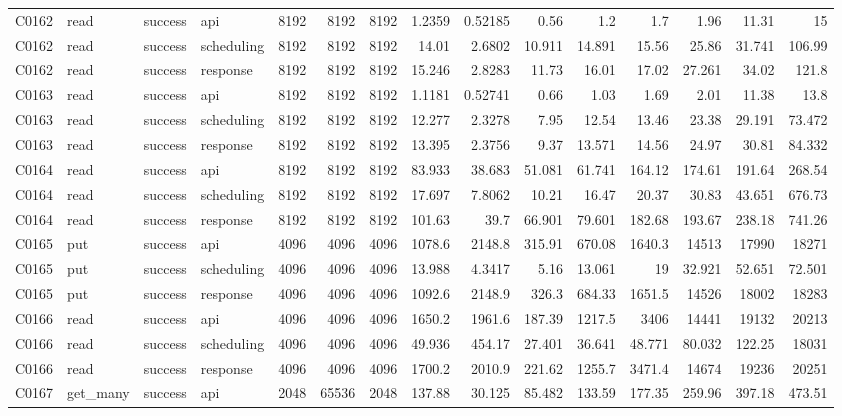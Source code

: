 \begin{landscape}
\begin{longtable}{llllrrrrrrrrrrr}
C0162 & read & success & api & 8192 & 8192 & 8192 & 1.2359 & 0.52185 & 0.56 & 1.2 & 1.7 & 1.96 & 11.31 & 15\\
C0162 & read & success & scheduling & 8192 & 8192 & 8192 & 14.01 & 2.6802 & 10.911 & 14.891 & 15.56 & 25.86 & 31.741 & 106.99\\
C0162 & read & success & response & 8192 & 8192 & 8192 & 15.246 & 2.8283 & 11.73 & 16.01 & 17.02 & 27.261 & 34.02 & 121.8\\
C0163 & read & success & api & 8192 & 8192 & 8192 & 1.1181 & 0.52741 & 0.66 & 1.03 & 1.69 & 2.01 & 11.38 & 13.8\\
C0163 & read & success & scheduling & 8192 & 8192 & 8192 & 12.277 & 2.3278 & 7.95 & 12.54 & 13.46 & 23.38 & 29.191 & 73.472\\
C0163 & read & success & response & 8192 & 8192 & 8192 & 13.395 & 2.3756 & 9.37 & 13.571 & 14.56 & 24.97 & 30.81 & 84.332\\
C0164 & read & success & api & 8192 & 8192 & 8192 & 83.933 & 38.683 & 51.081 & 61.741 & 164.12 & 174.61 & 191.64 & 268.54\\
C0164 & read & success & scheduling & 8192 & 8192 & 8192 & 17.697 & 7.8062 & 10.21 & 16.47 & 20.37 & 30.83 & 43.651 & 676.73\\
C0164 & read & success & response & 8192 & 8192 & 8192 & 101.63 & 39.7 & 66.901 & 79.601 & 182.68 & 193.67 & 238.18 & 741.26\\
C0165 & put & success & api & 4096 & 4096 & 4096 & 1078.6 & 2148.8 & 315.91 & 670.08 & 1640.3 & 14513 & 17990 & 18271\\
C0165 & put & success & scheduling & 4096 & 4096 & 4096 & 13.988 & 4.3417 & 5.16 & 13.061 & 19 & 32.921 & 52.651 & 72.501\\
C0165 & put & success & response & 4096 & 4096 & 4096 & 1092.6 & 2148.9 & 326.3 & 684.33 & 1651.5 & 14526 & 18002 & 18283\\
C0166 & read & success & api & 4096 & 4096 & 4096 & 1650.2 & 1961.6 & 187.39 & 1217.5 & 3406 & 14441 & 19132 & 20213\\
C0166 & read & success & scheduling & 4096 & 4096 & 4096 & 49.936 & 454.17 & 27.401 & 36.641 & 48.771 & 80.032 & 122.25 & 18031\\
C0166 & read & success & response & 4096 & 4096 & 4096 & 1700.2 & 2010.9 & 221.62 & 1255.7 & 3471.4 & 14674 & 19236 & 20251\\
C0167 & get\_\allowbreak{}many & success & api & 2048 & 65536 & 2048 & 137.88 & 30.125 & 85.482 & 133.59 & 177.35 & 259.96 & 397.18 & 473.51\\

\end{longtable}
\end{landscape}

